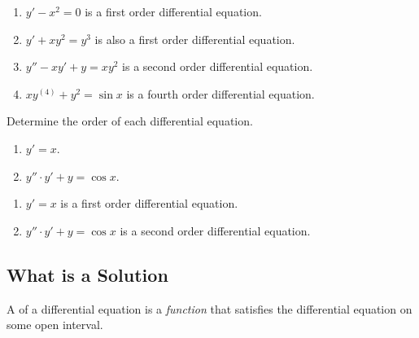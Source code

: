 \begin{example}
  \begin{enumerate}
    \item $y'- x^2=0$ is a first order differential equation.
    \item $y' + xy^2=y^3$ is also a first order differential equation.
    \item $y'' - xy' + y = xy^2$ is a second order differential equation.
    \item $xy^{(4)}+y^2=\sin x$ is a fourth order differential equation.
  \end{enumerate}
\end{example}

\begin{exercise}
  Determine the order of each differential equation.
  \begin{enumerate}
    \item $y' = x$.
    \item $y''\cdot y' + y =\cos x$.
  \end{enumerate}
\end{exercise}

\begin{exersol}
  \begin{enumerate}
    \item $y' = x$ is a first order differential equation.
    \item $y''\cdot y' + y =\cos x$ is a second order differential equation.
  \end{enumerate}
\end{exersol}

\subsection{What is a Solution}
\begin{definition}{}{}
  A  of a differential equation is a \emph{function} that satisfies the differential equation on some open interval.
\end{definition}

